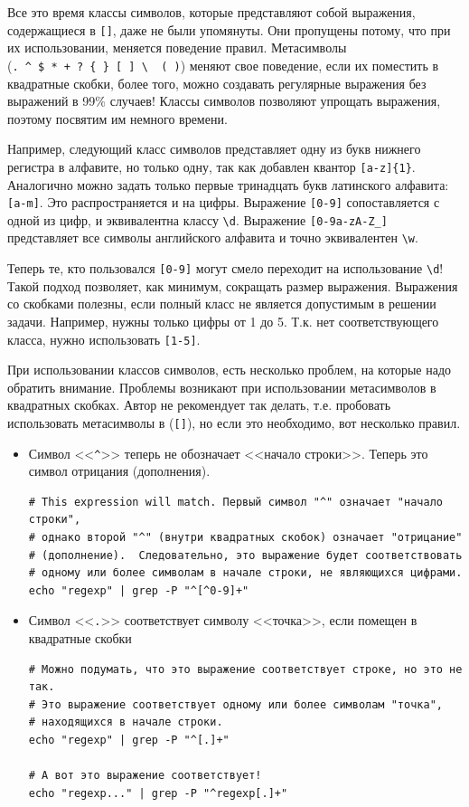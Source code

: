 \documentclass[a4paper,12pt,final,openany]{extbook}
\providecommand{\tightlist}{%
  \setlength{\itemsep}{0pt}\setlength{\parskip}{0pt}}
\begin{document}
Все это время классы
символов, которые представляют собой выражения, содержащиеся в
\texttt{{[}{]}}, даже не были упомянуты. Они пропущены потому, что при их использовании, меняется поведение правил. Метасимволы
(\texttt{.\ \^{}\ \$\ *\ +\ ?\ \{\ \}\ {[}\ {]}\ \textbackslash{}\ \textbar{}\ (\ )})
меняют свое поведение, если их поместить в квадратные скобки, более
того, можно создавать регулярные выражения без выражений в 99\% случаев!
Классы символов позволяют упрощать выражения, поэтому посвятим им
немного времени.

Например, следующий класс символов представляет
одну из букв нижнего регистра в алфавите, но только одну, так как
добавлен квантор \texttt{{[}a-z{]}\{1\}}. Аналогично можно задать только
первые тринадцать букв латинского алфавита: \texttt{{[}a-m{]}}. Это распространяется и на
цифры. Выражение \texttt{{[}0-9{]}} сопоставляется с одной из цифр, и
эквивалентна классу \texttt{\textbackslash{}d}. Выражение
\texttt{{[}0-9a-zA-Z\_{]}} представляет все символы английского алфавита
и точно эквивалентен \texttt{\textbackslash{}w}.

Теперь те, кто пользовался \texttt{{[}0-9{]}} могут смело переходит на
использование \texttt{\textbackslash{}d}! Такой подход позволяет, как
минимум, сокращать размер выражения. Выражения со скобками полезны, если
полный класс не является допустимым в решении задачи. Например, нужны
только цифры от 1 до 5. Т.к. нет соответствующего класса, нужно
использовать \texttt{{[}1-5{]}}.

При использовании классов символов, есть несколько проблем, на которые
надо обратить внимание. Проблемы возникают при использовании метасимволов в квадратных скобках.
Автор не рекомендует так делать, т.е. пробовать использовать метасимволы в
(\texttt{{[}{]}}), но если это необходимо, вот несколько правил.
\begin{itemize}
\tightlist
\item
  Символ <<\texttt{\^{}}>> теперь не обозначает <<начало строки>>. Теперь это
  символ отрицания (дополнения).
\begin{verbatim}
# This expression will match. Первый символ "^" означает "начало строки",
# однако второй "^" (внутри квадратных скобок) означает "отрицание"
# (дополнение).  Следовательно, это выражение будет соответствовать
# одному или более символам в начале строки, не являющихся цифрами.
echo "regexp" | grep -P "^[^0-9]+"
\end{verbatim}
\item
  Символ <<\texttt{.}>> соответствует символу <<точка>>, если помещен в
  квадратные скобки
\begin{verbatim}
# Можно подумать, что это выражение соответствует строке, но это не так.
# Это выражение соответствует одному или более символам "точка",
# находящихся в начале строки.
echo "regexp" | grep -P "^[.]+"

# А вот это выражение соответствует!
echo "regexp..." | grep -P "^regexp[.]+"
\end{verbatim}
\end{itemize}
\end{document}

